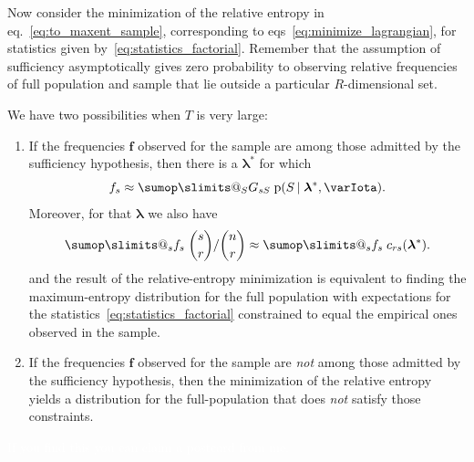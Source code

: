 \documentclass[\ifafour a4paper,12pt,\else a5paper,10pt,\fi%
onecolumn,oneside,article,%
british%
]{memoir}
\makeatletter
\theoremstyle{remark}
\theoremstyle{innote}
\def\sum{\DOTSI\sumop\slimits@}
\newcommand*{\pf}{\mathrm{p}}%
\renewcommand*{\|}{\nonscript\,\vert\nonscript\;\mathopen{}}
\newcommand*{\eqn}{eq.}%
\newcommand*{\eqns}{eqs}%
\newcommand*{\tsum}{\mathop{\textstyle\sum}\nolimits}
\newcommand*{\yS}{S}
\newcommand*{\ys}{s}
\newcommand*{\yst}{\bm{\ys}}
\newcommand*{\yll}{\lambda}
\newcommand*{\yl}{\bm{\lambda}}
\newcommand*{\yg}{g}
\newcommand*{\yI}{\varIota}
\newcommand*{\yf}{\bm{f}}
\makeatother
\begin{document}
Now consider the minimization of the relative entropy in
\eqn~\eqref{eq:to_maxent_sample}, corresponding to
\eqns~\eqref{eq:minimize_lagrangian}, for statistics given
by~\eqref{eq:statistics_factorial}. Remember that the assumption of
sufficiency asymptotically gives zero probability to observing relative
frequencies of full population and sample that lie outside a particular
$R$-dimensional set.

We have two possibilities when $T$ is very large:
\begin{enumerate}[label=\arabic*.]
\item If the frequencies $\yf$ observed for the sample are among those
  admitted by the sufficiency hypothesis, then there is a $\yl^*$ for which
  \begin{equation}
    \label{eq:condition_admitted_freqs}
    f_{\ys} \approx \sum_{\yS} G_{\ys\yS}\;\pf(\yS \| \yl^*, \yI).
  \end{equation}
Moreover, for that $\yl$ we also have
\begin{equation}
  \label{eq:condition_admitted_freqs_expectation}
  \sum_{\ys}  f_{\ys}\;\binom{\ys}{r}/\binom{n}{r}
  \approx
  \sum_{\ys} f_{\ys}\;c_{r\ys}(\yl^*).
\end{equation}
and the result of the relative-entropy minimization is equivalent to
finding the maximum-entropy distribution for the full population with
expectations for the statistics~\eqref{eq:statistics_factorial} constrained
to equal the empirical ones observed in the sample.
\item If the frequencies $\yf$ observed for the sample are \emph{not} among
  those admitted by the sufficiency hypothesis, then the minimization of
  the relative entropy yields a distribution for the full-population that
  does \emph{not} satisfy those constraints.
\end{enumerate}

\textcolor{white}{If you find this you can claim a postcard from me.}


\end{document}
